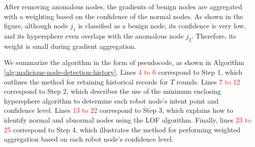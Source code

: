 \documentclass[lettersize,journal]{IEEEtran}
\begin{document}
After removing anomalous nodes, the gradients of benign nodes are aggregated with a weighting based on the confidence of the normal nodes. As shown in the figure, although node $j_1$ is classified as a benign node, its confidence is very low, and its hypersphere even overlaps with the anomalous node $j_2$. Therefore, its weight is small during gradient aggregation.


We summarize the algorithm in the form of pseudocode, as shown in Algorithm \ref{alg:malicious-node-detection-history}. Lines \textcolor{red}{4 to 6} correspond to Step 1, which outlines the method for retaining historical records for \(T\) rounds. Lines \textcolor{red}{7 to 12} correspond to Step 2, which describes the use of the minimum enclosing hypersphere algorithm to determine each robot node's intent point and confidence level. Lines \textcolor{red}{13 to 22} correspond to Step 3, which explains how to identify normal and abnormal nodes using the LOF algorithm. Finally, lines \textcolor{red}{23 to 25} correspond to Step 4, which illustrates the method for performing weighted aggregation based on each robot node's confidence level.
\end{document}
